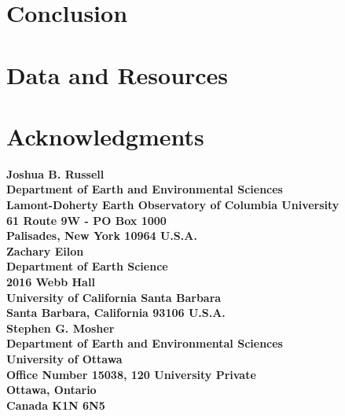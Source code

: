 \documentclass[12pt,titlepage]{article}
\begin{document}
\section{Conclusion }


\section{Data and Resources }


\section{Acknowledgments }


\newpage
{\bfseries\sffamily 
\noindent Joshua B. Russell \\
Department of Earth and Environmental Sciences \\
Lamont-Doherty Earth Observatory of Columbia University \\
61 Route 9W - PO Box 1000 \\
Palisades, New York 10964 U.S.A. \\

\noindent Zachary Eilon \\
Department of Earth Science \\
2016 Webb Hall \\
University of California Santa Barbara \\
Santa Barbara, California 93106 U.S.A. \\

\noindent Stephen G. Mosher \\
Department of Earth and Environmental Sciences \\
University of Ottawa \\
Office Number 15038, 120 University Private \\
Ottawa, Ontario \\
Canada K1N 6N5
}
\newpage
%
%



\newpage

\newpage

\end{document}
